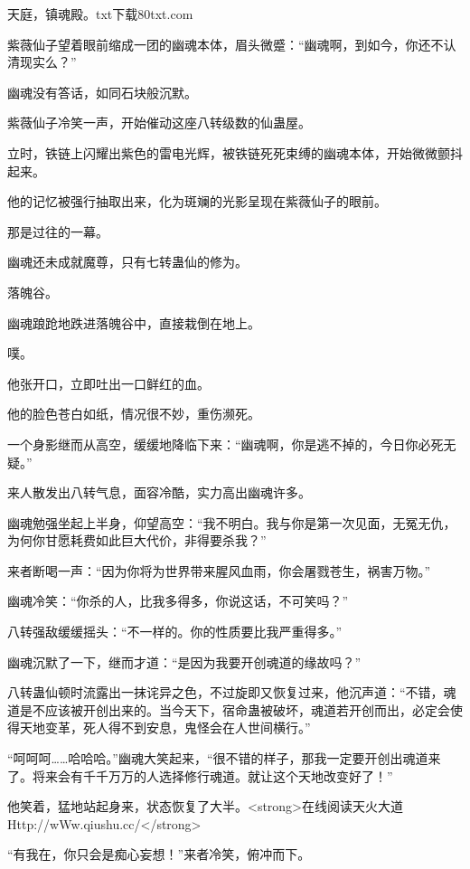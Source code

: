 
\begin{this_body}

天庭，镇魂殿。txt下载80txt.com

紫薇仙子望着眼前缩成一团的幽魂本体，眉头微蹙：“幽魂啊，到如今，你还不认清现实么？”

幽魂没有答话，如同石块般沉默。

紫薇仙子冷笑一声，开始催动这座八转级数的仙蛊屋。

立时，铁链上闪耀出紫色的雷电光辉，被铁链死死束缚的幽魂本体，开始微微颤抖起来。

他的记忆被强行抽取出来，化为斑斓的光影呈现在紫薇仙子的眼前。

那是过往的一幕。

幽魂还未成就魔尊，只有七转蛊仙的修为。

落魄谷。

幽魂踉跄地跌进落魄谷中，直接栽倒在地上。

噗。

他张开口，立即吐出一口鲜红的血。

他的脸色苍白如纸，情况很不妙，重伤濒死。

一个身影继而从高空，缓缓地降临下来：“幽魂啊，你是逃不掉的，今日你必死无疑。”

来人散发出八转气息，面容冷酷，实力高出幽魂许多。

幽魂勉强坐起上半身，仰望高空：“我不明白。我与你是第一次见面，无冤无仇，为何你甘愿耗费如此巨大代价，非得要杀我？”

来者断喝一声：“因为你将为世界带来腥风血雨，你会屠戮苍生，祸害万物。”

幽魂冷笑：“你杀的人，比我多得多，你说这话，不可笑吗？”

八转强敌缓缓摇头：“不一样的。你的性质要比我严重得多。”

幽魂沉默了一下，继而才道：“是因为我要开创魂道的缘故吗？”

八转蛊仙顿时流露出一抹诧异之色，不过旋即又恢复过来，他沉声道：“不错，魂道是不应该被开创出来的。当今天下，宿命蛊被破坏，魂道若开创而出，必定会使得天地变革，死人得不到安息，鬼怪会在人世间横行。”

“呵呵呵……哈哈哈。”幽魂大笑起来，“很不错的样子，那我一定要开创出魂道来了。将来会有千千万万的人选择修行魂道。就让这个天地改变好了！”

他笑着，猛地站起身来，状态恢复了大半。<strong>在线阅读天火大道Http://wWw.qiushu.cc/</strong>

“有我在，你只会是痴心妄想！”来者冷笑，俯冲而下。


\end{this_body}
